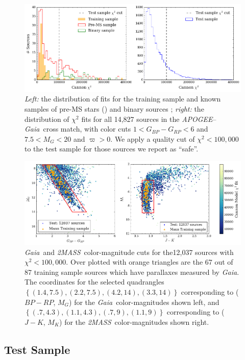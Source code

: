 \documentclass[twocolumn]{aastex62}
\newcommand{\apogee}{\textsl{APOGEE}}
\newcommand{\gaia}{\textsl{Gaia}}
\newcommand{\zmass}{\textsl{2MASS}}
\begin{document}
\begin{figure}
	\includegraphics[width=\linewidth]{figures/cannon_chi_dist.png}
	\caption{\textit{Left:} the distribution of fits for the training sample and known samples of pre-MS stars (\citealt{Cottaar:2014}) and binary sources \citep{ElBadry:2018,Skinner:2018}; \textit{right:} the distribution of $\chi^2$ fits for all 14,827 sources in the \apogee --\gaia\ cross match, with color cuts $1<G_{BP}-G_{RP}<6$ and $7.5<M_{G}<20$ and $\varpi>0$. We apply a quality cut of $\chi^2 < 100,000$ to the test sample for those sources we report as ``safe''.}
	\label{fig:chi_dist}
\end{figure}

\begin{figure}
	\includegraphics[width=\linewidth]{figures/cmd_selection.png}
	\caption{\gaia\ and \zmass\ color-magnitude cuts for the12,037 sources with $\chi^2<100,000$. Over plotted with orange triangles are the 67 out of 87 training sample sources which have parallaxes measured by \gaia. The coordinates for the selected quadrangles 
	$\left\{ (1.4, 7.5), (2.2, 7.5), (4.2, 14), (3.3, 14) \right\}$ corresponding to ($BP-RP$, $M_G$) for the \gaia\ color-magnitudes shown left, and 
	$\left\{ (.7, 4.3), (1.1, 4.3), (.7, 9), (1.1, 9) \right\}$ corresponding to ($J-K$, $M_K$) for the \zmass\ color-magnitudes shown right. }
	\label{fig:cmd_selection}
\end{figure}


\subsection{Test Sample \label{subsec:test_selection}} 
\end{document}
